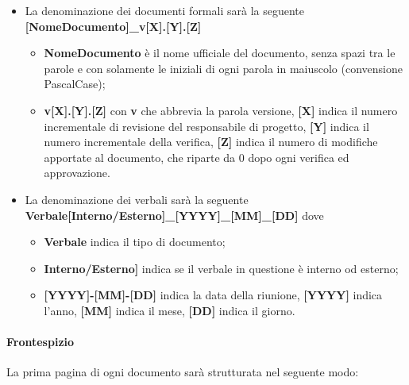 \begin{itemize}

	\item La denominazione dei documenti formali sarà la seguente \newline
	\textbf{[NomeDocumento]\_v[X].[Y].[Z]}
	\begin{itemize}
		\item \textbf{NomeDocumento} è il nome ufficiale del documento, senza spazi tra le parole e con solamente le iniziali di ogni parola in maiuscolo (convensione PascalCase);
		\item \textbf{v[X].[Y].[Z]} con \textbf{v} che abbrevia la parola versione, \textbf{[X]} indica il numero incrementale di revisione del responsabile di progetto, \textbf{[Y]} indica il numero incrementale della verifica, \textbf{[Z]} indica il numero di modifiche apportate al documento, che riparte da 0 dopo ogni verifica ed approvazione.
	\end{itemize}
	\item La denominazione dei verbali sarà la seguente\newline
	\textbf{Verbale[Interno/Esterno]\_[YYYY]\_[MM]\_[DD]}\newline
	dove
	\begin{itemize}
		\item \textbf{Verbale} indica il tipo di documento;
		\item \textbf{Interno/Esterno]} indica se il verbale in questione è interno od esterno;
		\item \textbf{[YYYY]-[MM]-[DD]}  indica la data della riunione, \textbf{[YYYY]} indica l'anno, \textbf{[MM]} indica il mese, \textbf{[DD]} indica il giorno.
	\end{itemize}
		

\end{itemize}

\paragraph{Frontespizio}

La prima pagina di ogni documento sarà strutturata nel seguente modo:

